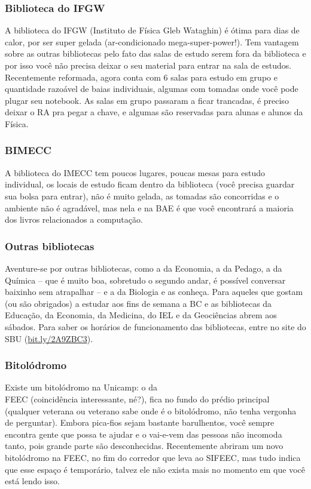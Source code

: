 \subsubsection{Biblioteca do IFGW}

A biblioteca do IFGW (Instituto de Física Gleb Wataghin) é ótima para dias de
calor, por ser super gelada (ar-condicionado mega-super-power!). Tem vantagem
sobre as outras bibliotecas pelo fato das salas de estudo serem fora da
biblioteca e por isso você não precisa deixar o seu material para entrar na
sala de estudos. Recentemente reformada, agora conta com 6 salas para estudo em
grupo e quantidade razoável de baias individuais, algumas com tomadas onde você
pode plugar seu notebook. As salas em grupo passaram a ficar trancadas, é
preciso deixar o RA pra pegar a chave, e algumas são reservadas para alunas e
alunos da Física.

\subsubsection{BIMECC}

A biblioteca do IMECC tem poucos lugares, poucas mesas para estudo individual,
os locais de estudo ficam dentro da biblioteca (você precisa guardar sua bolsa
para entrar), não é muito gelada, as tomadas são concorridas e o ambiente não é
agradável, mas nela e na BAE é que você encontrará a maioria dos livros
relacionados a computação.

\subsubsection{Outras bibliotecas}

Aventure-se por outras bibliotecas, como a da Economia, a da Pedago, a da
Química -- que é muito boa, sobretudo o segundo andar, é possível conversar
baixinho sem atrapalhar -- e a da Biologia e as conheça. Para aqueles que
gostam (ou são obrigados) a estudar aos fins de semana a BC e as bibliotecas da
Educação, da Economia, da Medicina, do IEL e da Geociências abrem aos sábados.
Para saber os horários de funcionamento das bibliotecas, entre no site do SBU
(\url{bit.ly/2A9ZBC3}).

\subsubsection{Bitolódromo}

Existe um bitolódromo na Unicamp: o da\\FEEC (coincidência interessante, né?),
fica no fundo do prédio principal (qualquer veterana ou veterano sabe onde é o
bitolódromo, não tenha vergonha de perguntar). Embora pica-fios sejam bastante
barulhentos, você sempre encontra gente que possa te ajudar e o vai-e-vem das
pessoas não incomoda tanto, pois grande parte são desconhecidas. Recentemente
abriram um novo bitolódromo na FEEC, no fim do corredor que leva ao SIFEEC, mas
tudo indica que esse espaço é temporário, talvez ele não exista mais no momento
em que você está lendo isso.

